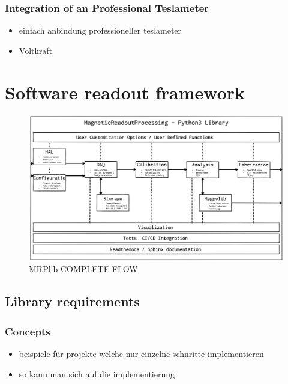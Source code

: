 \hypertarget{integration-of-an-professional-teslameter}{%
\subsection{Integration of an Professional
Teslameter}\label{integration-of-an-professional-teslameter}}

\begin{itemize}
\tightlist
\item
  einfach anbindung professioneller teslameter
\item
  Voltkraft
\end{itemize}

\hypertarget{software-readout-framework}{%
\chapter{Software readout framework}\label{software-readout-framework}}

\begin{figure}
\centering
\includegraphics{./generated_images/border_MRPlib_COMPLETE_FLOW.png}
\caption{MRPlib COMPLETE FLOW \label{MRPlib_COMPLETE_FLOW.png}}
\end{figure}

\hypertarget{library-requirements}{%
\section{Library requirements}\label{library-requirements}}

\hypertarget{concepts}{%
\subsection{Concepts}\label{concepts}}

\begin{itemize}
\tightlist
\item
  beispiele für projekte welche nur einzelne schnritte implementieren
\item
  so kann man sich auf die implementierung
\end{itemize}


